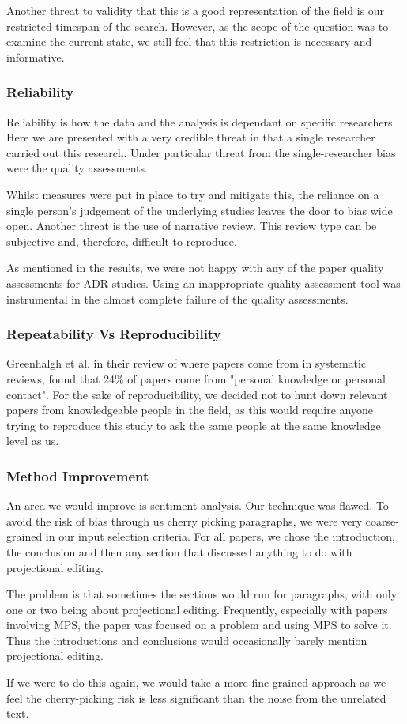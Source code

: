 Another threat to validity that this is a good representation of the field is our restricted timespan of the search.
However, as the scope of the question was to examine the current state, we still feel that this restriction is necessary and informative.

\subsubsection{Reliability}
Reliability is how the data and the analysis is dependant on specific researchers.
Here we are presented with a very credible threat in that a single researcher carried out this research.
Under particular threat from the single-researcher bias were the quality assessments. 

Whilst measures were put in place to try and mitigate this, the reliance on a single person's judgement of the underlying studies leaves the door to bias wide open.
Another threat is the use of narrative review. 
This review type can be subjective and, therefore, difficult to reproduce.

As mentioned in the results, we were not happy with any of the paper quality assessments for ADR studies.
Using an inappropriate quality assessment tool was instrumental in the almost complete failure of the quality assessments.


\subsubsection{Repeatability Vs Reproducibility}
Greenhalgh et al.\cite{GreenhalghTrisha2005Eaeo} in their review of where papers come from in systematic reviews, found that 24\% of papers come from "personal knowledge or personal contact".
For the sake of reproducibility, we decided not to hunt down relevant papers from knowledgeable people in the field, as this would require anyone trying to reproduce this study to ask the same people at the same knowledge level as us.

\subsubsection{Method Improvement}
An area we would improve is sentiment analysis.
Our technique was flawed.
To avoid the risk of bias through us cherry picking paragraphs, we were very coarse-grained in our input selection criteria.
For all papers, we chose the introduction, the conclusion and then any section that discussed anything to do with projectional editing.

The problem is that sometimes the sections would run for paragraphs, with only one or two being about projectional editing.
Frequently, especially with papers involving MPS, the paper was focused on a problem and using MPS to solve it.
Thus the introductions and conclusions would occasionally barely mention projectional editing.

If we were to do this again, we would take a more fine-grained approach as we feel the cherry-picking risk is less significant than the noise from the unrelated text.
